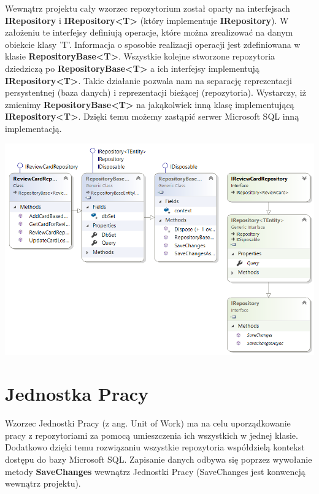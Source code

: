 Wewnątrz projektu cały wzorzec repozytorium został oparty na interfejsach \textbf{IRepository} i \textbf{IRepository<T>} (który implementuje \textbf{IRepository}). W założeniu te interfejsy definiują operacje, które można zrealizować na danym obiekcie klasy 'T'. Informacja o sposobie realizacji operacji jest zdefiniowana w klasie \textbf{RepositoryBase<T>}.
Wszystkie kolejne stworzone repozytoria dziedziczą po \textbf{RepositoryBase<T>} a ich interfejsy implementują \textbf{IRepository<T>}. 
Takie działanie pozwala nam na separację reprezentacji persystentnej (baza danych) i reprezentacji bieżącej (repozytoria). Wystarczy, iż zmienimy \textbf{RepositoryBase<T>} na jakąkolwiek inną klasę implementującą \textbf{IRepository<T>}. Dzięki temu możemy zastąpić serwer Microsoft SQL inną implementacją.

\newpage
\begin{center}
	\includegraphics[width=\textwidth]{images/ReviewRepository.png}
\end{center}

\section{Jednostka Pracy}

Wzorzec Jednostki Pracy (z ang. Unit of Work)\cite{RepositoryUnitOfWorkPattern} ma na celu uporządkowanie pracy z repozytoriami za pomocą umieszczenia ich wszystkich w jednej klasie. Dodatkowo dzięki temu rozwiązaniu wszystkie repozytoria współdzielą kontekst dostępu do bazy Microsoft SQL. Zapisanie danych odbywa się poprzez wywołanie metody \textbf{SaveChanges} wewnątrz Jednostki Pracy (SaveChanges jest konwencją wewnątrz projektu).

